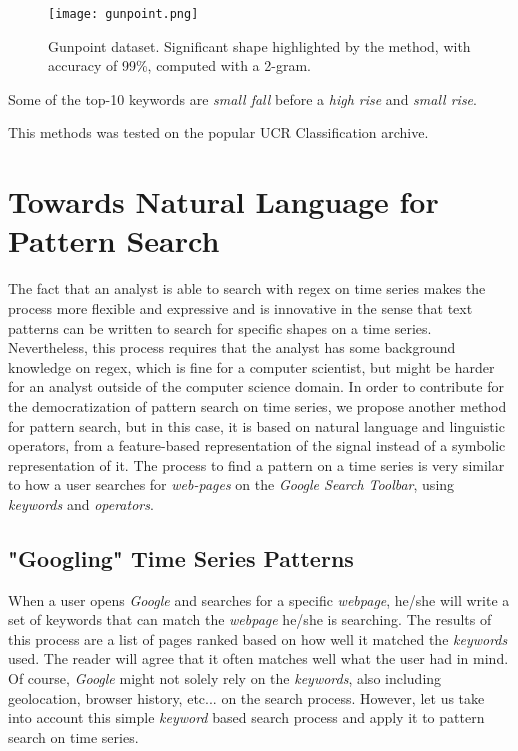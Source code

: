 {\begin{figure}
    \centering
    \texttt{[image: gunpoint.png]}
    \caption{Gunpoint dataset. Significant shape highlighted by the method, with accuracy of 99\%, computed with a 2-gram.}
    \label{fig:GunPoint}
\end{figure}
 Some of the top-10 keywords are \textit{small fall} before a \textit{high rise} and \textit{small rise}.


This methods was tested on the popular UCR Classification archive. 







\section{Towards Natural Language for Pattern Search}

The fact that an analyst is able to search with \gls{regex} on time series makes the process more flexible and expressive and is innovative in the sense that text patterns can be written to search for specific shapes on a time series. Nevertheless, this process requires that the analyst has some background knowledge on \gls{regex}, which is fine for a computer scientist, but might be harder for an analyst outside of the computer science domain. In order to contribute for the democratization of pattern search on time series, we propose another method for pattern search, but in this case, it is based on natural language and linguistic operators, from a feature-based representation of the signal instead of a symbolic representation of it. The process to find a pattern on a time series is very similar to how a user searches for \textit{web-pages} on the \textit{Google Search Toolbar}, using \textit{keywords} and \textit{operators}.

\subsection{"Googling" Time Series Patterns}

When a user opens \textit{Google} and searches for a specific \textit{webpage}, he/she will write a set of keywords that can match the \textit{webpage} he/she is searching. The results of this process are a list of pages ranked based on how well it matched the \textit{keywords} used. The reader will agree that it often matches well what the user had in mind. Of course, \textit{Google} might not solely rely on the \textit{keywords}, also including geolocation, browser history, etc... on the search process. However, let us take into account this simple \textit{keyword} based search process and apply it to pattern search on time series.

}

